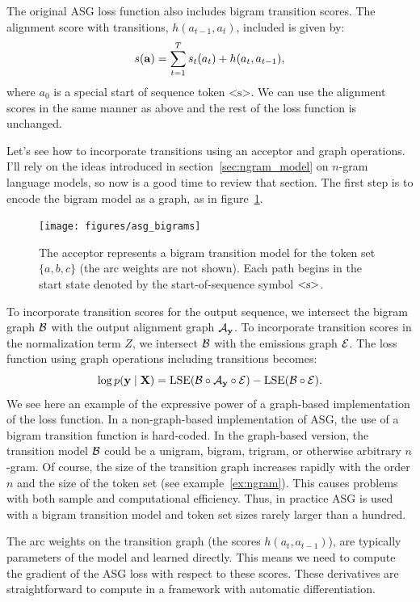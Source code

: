 The original ASG loss function also includes bigram transition scores. The
alignment score with transitions, $h(a_{t-1}, a_t)$, included is given by:
$$
s({\bf a}) = \sum_{t=1}^T s_t(a_t) + h(a_t, a_{t-1}),
$$
where $a_0$ is a special start of sequence token $\textrm{<s>}$. We can use the
alignment scores in the same manner as above and the rest of the loss function
is unchanged.

Let's see how to incorporate transitions using an acceptor and graph
operations. I'll rely on the ideas introduced in section~\ref{sec:ngram_model}
on $n$-gram language models, so now is a good time to review that section. The
first step is to encode the bigram model as a graph, as in
figure~\ref{fig:asg_bigrams}.

\begin{figure}
    \centering
    \texttt{[image: figures/asg\_bigrams]}
    \caption{The acceptor represents a bigram transition model for the token
    set $\{a, b, c\}$ (the arc weights are not shown). Each path begins in the
    start state denoted by the start-of-sequence symbol $\textrm{\textless s\textgreater}$.}
    \label{fig:asg_bigrams}
\end{figure}

To incorporate transition scores for the output sequence, we intersect the
bigram graph $\mathcal{B}$ with the output alignment graph $\mathcal{A}_{\bf y}$. To incorporate
transition scores in the normalization term $Z$, we intersect $\mathcal{B}$ with the
emissions graph $\mathcal{E}$. The loss function using graph operations including
transitions becomes:
$$
\log p({\bf y} \mid {\bf X}) = \operatorname*{\textrm{LSE}}(\mathcal{B} \circ \mathcal{A}_{\bf y} \circ \mathcal{E}) - \operatorname*{\textrm{LSE}}(\mathcal{B} \circ \mathcal{E}).
$$
We see here an example of the expressive power of a graph-based implementation
of the loss function. In a non-graph-based implementation of ASG, the use of a
bigram transition function is hard-coded. In the graph-based version, the
transition model $\mathcal{B}$ could be a unigram, bigram, trigram, or otherwise
arbitrary $n$-gram. Of course, the size of the transition graph increases
rapidly with the order $n$ and the size of the token set (see
example~\ref{ex:ngram}). This causes problems with both sample and
computational efficiency. Thus, in practice ASG is used with a bigram
transition model and token set sizes rarely larger than a hundred.

The arc weights on the transition graph (the scores $h(a_t, a_{t-1})$), are
typically parameters of the model and learned directly. This means we need to
compute the gradient of the ASG loss with respect to these scores. These
derivatives are straightforward to compute in a framework with automatic
differentiation.

